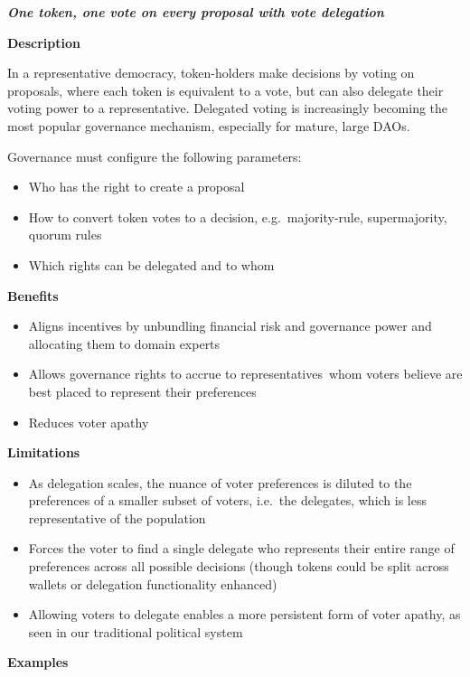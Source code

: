 \documentclass[
]{article}
\providecommand{\tightlist}{%
  \setlength{\itemsep}{0pt}\setlength{\parskip}{0pt}}
\begin{document}
\textbf{\emph{One token, one vote on every proposal with vote
delegation}}

\textbf{Description}

In a representative democracy, token-holders make decisions by voting on
proposals, where each token is equivalent to a vote, but can also
delegate their voting power to a representative. Delegated voting is
increasingly becoming the most popular governance mechanism, especially
for mature, large DAOs.

Governance must configure the following parameters:

\begin{itemize}
\tightlist
\item
  Who has the right to create a proposal
\item
  How to convert token votes to a decision, e.g.~majority-rule,
  supermajority, quorum rules
\item
  Which rights can be delegated and to whom
\end{itemize}

\textbf{Benefits}

\begin{itemize}
\tightlist
\item
  Aligns incentives by unbundling financial risk and governance power
  and allocating them to domain experts
\item
  Allows governance rights to accrue to representatives~whom voters
  believe are best placed to represent their preferences
\item
  Reduces voter apathy
\end{itemize}

\textbf{Limitations}

\begin{itemize}
\tightlist
\item
  As delegation scales, the nuance of voter preferences is diluted to
  the preferences of a smaller subset of voters, i.e.~the delegates,
  which is less representative of the population
\item
  Forces the voter to find a single delegate who represents their entire
  range of preferences across all possible decisions (though tokens
  could be split across wallets or delegation functionality enhanced)
\item
  Allowing voters to delegate enables a more persistent form of voter
  apathy, as seen in our traditional political system
\end{itemize}

\textbf{Examples}
\end{document}
